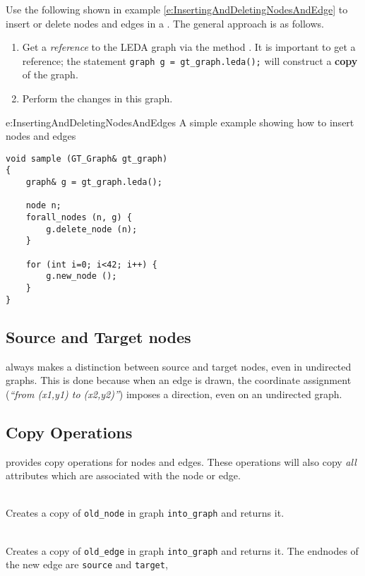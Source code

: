 \documentclass[twoside,fleqn]{report}
\begin{document}
\noindent Use the following shown in example
\ref{e:InsertingAndDeletingNodesAndEdge} to insert or delete
nodes and edges in a . The general approach is as
follows.

\begin{enumerate}
  \item Get a \emph{reference} to the LEDA graph via the method
  . It is important to get a reference; the
  statement \verb|graph g = gt_graph.leda();| will construct a
  \textbf{copy} of the graph.

  \item  Perform the changes in this graph.
\end{enumerate}

\begin{example}{e:InsertingAndDeletingNodesAndEdges}%
{A simple example showing how to insert nodes and edges}
\begin{verbatim}
void sample (GT_Graph& gt_graph)
{
    graph& g = gt_graph.leda();
    
    node n;
    forall_nodes (n, g) {
        g.delete_node (n);
    }
    
    for (int i=0; i<42; i++) {
        g.new_node ();
    }
}
\end{verbatim}
\end{example}

%
%

\subsection{Source and Target nodes}

\Graphlet{} always makes a distinction between source and target 
nodes, even in undirected graphs.  This is done because when an edge 
is drawn, the coordinate assignment (\emph{``from (x1,y1) to 
(x2,y2)''}) imposes a direction, even on an undirected graph.


%
%

\subsection{Copy Operations}

 provides copy operations for nodes and edges. These
operations will also copy \emph{all} attributes which are
associated with the node or edge.

\begin{Cdefinition}
  

  \item[virtual node copy (node n, \GT{Graph}\& into\_graph);] \strut\\
  Creates a copy of \texttt{old\_node} in graph
  \texttt{into\_graph} and returns it.
  
  \item[virtual edge copy (edge e, node source, node target,
  \GT{Graph}\& into\_graph);] \strut\\
  Creates a copy of \texttt{old\_edge} in graph
  \texttt{into\_graph} and returns it.  The endnodes of the new edge are
  \texttt{source} and \texttt{target},

\end{Cdefinition}
\end{document}
